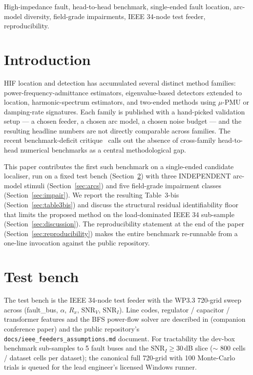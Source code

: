 \documentclass[journal]{IEEEtran}
\newcommand{\benchNCells}{$\sim$ 800 cells / dataset}
\begin{document}
\begin{IEEEkeywords}
High-impedance fault, head-to-head benchmark, single-ended fault
location, arc-model diversity, field-grade impairments, IEEE 34-node
test feeder, reproducibility.
\end{IEEEkeywords}

\section{Introduction}\label{sec:intro}
HIF location and detection has accumulated several distinct method
families: power-frequency-admittance estimators, eigenvalue-based
detectors extended to location, harmonic-spectrum estimators, and
two-ended methods using $\mu$-PMU or damping-rate signatures.  Each
family is published with a hand-picked validation setup --- a chosen
feeder, a chosen arc model, a chosen noise budget --- and the
resulting headline numbers are not directly comparable across
families.  The recent benchmark-deficit critique~\cite{ArXiv2510_00831}
calls out the absence of cross-family head-to-head numerical
benchmarks as a central methodological gap.

This paper contributes the first such benchmark on a single-ended
candidate localiser, run on a fixed test bench (Section~\ref{sec:bench})
with three INDEPENDENT arc-model stimuli (Section~\ref{sec:arcs}) and
five field-grade impairment classes (Section~\ref{sec:impair}).  We
report the resulting Table~3-bis (Section~\ref{sec:table3bis}) and
discuss the structural residual identifiability floor that limits
the proposed method on the load-dominated IEEE 34 sub-sample
(Section~\ref{sec:discussion}).  The reproducibility statement at
the end of the paper (Section~\ref{sec:reproducibility}) makes the
entire benchmark re-runnable from a one-line invocation against the
public repository.

\section{Test bench}\label{sec:bench}
The test bench is the IEEE 34-node test feeder with the WP3.3
720-grid sweep across (fault\_bus, $\alpha$, $R_x$, $\mathrm{SNR}_V$,
$\mathrm{SNR}_I$).  Line codes, regulator / capacitor / transformer
features and the BFS power-flow solver are described in
\cite{Phase3conf2027} (companion conference paper) and the public
repository's \texttt{docs/ieee\_feeders\_assumptions.md} document.
For tractability the dev-box benchmark sub-samples to 5 fault buses
and the $\mathrm{SNR}_I \geq 30$\,dB slice (\benchNCells{} cells per
dataset); the canonical full 720-grid with 100 Monte-Carlo trials
is queued for the lead engineer's licensed Windows runner.
\end{document}
